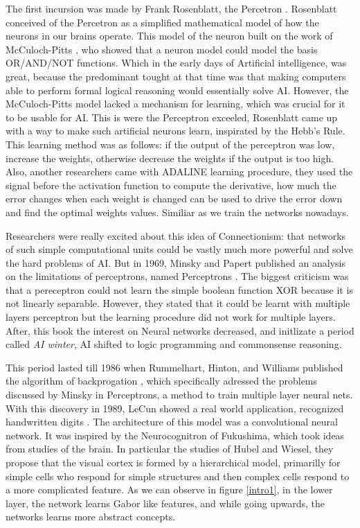 \documentclass[12pt, a4paper, titlepage,twoside,openright]{article}
\begin{document}
The first incursion was made by Frank Rosenblatt, the Percetron \cite{rosenblat}. Rosenblatt conceived of the Percetron as a simplified mathematical model of how the neurons in our brains operate. This model of the neuron built on the work of McCuloch-Pitts \cite{McCulloch}, who showed that a neuron model could model the basis OR/AND/NOT functions. Which in the early days of Artificial intelligence, was great, because the predominant tought at that time was that making computers able to perform formal logical reasoning would essentially solve AI. However, the McCuloch-Pitts model lacked a mechanism for learning, which was crucial for it to be usable for AI. This is were the Perceptron exceeled, Rosenblatt came up with a way to make such artificial neurons learn, inspirated by the Hebb's Rule. This learning method was as follows: if the output of the perceptron was low, increase the weights, otherwise decrease the weights if the output is too high. Also, another researchers came with ADALINE \cite{adaline} learning procedure, they used the signal before the activation function to compute the derivative, how much the error changes when each weight is changed can be used to drive the error down and find the optimal weights values. Similiar as we train the networks nowadays.

Researchers were really excited about this idea of Connectionism: that networks of such simple computational units could be vastly much more powerful and solve the hard problems of AI. But in 1969, Minsky and Papert  published an analysis on the limitations of perceptrons, named Perceptrons \cite{minsky69perceptrons}. The biggest criticism was that a pereceptron could not learn the simple boolean function XOR because it is not linearly separable. However, they stated that it could be learnt with multiple layers perceptron but the learning procedure did not work for multiple layers. After, this book the interest on Neural networks decreased, and initlizate a period called \textit{AI winter}, AI shifted to logic programming and commonsense reasoning.

This period lasted till 1986 when Rummelhart, Hinton, and Williams published the algorithm of backprogation \cite{Rumelhart}, which specifically adressed the problems discussed by Minsky in Perceptrons, a method to train multiple layer neural nets. With this discovery in 1989, LeCun showed a real world application, recognized handwritten digits \cite{lecunZip}. The architecture of this model was a convolutional neural network. It was inspired by the Neurocognitron \cite{Fukushima} of Fukushima, which took ideas from studies of the brain. In particular the studies of Hubel and Wiesel, they propose that the visual cortex is formed by a hierarchical model, primarilly for simple cells who respond for simple structures and then complex cells respond to a more complicated feature. As we can observe in figure \ref{intro1}, in the lower layer, the network learns Gabor like features, and while going upwards, the networks learns more abstract concepts.
\end{document}
